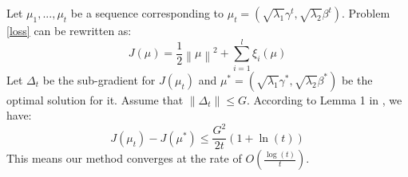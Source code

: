
Let $\mu_1,...,\mu_t$ be a sequence corresponding to $\mu_t=(\sqrt{\lambda_1}\gamma^t,\sqrt{\lambda_2}\beta^t)$. Problem \eqref{loss} can be rewritten as:
\begin{equation*}
J(\mu)=\frac{1}{2}{\left\| \mu  \right\|^2} + \sum\limits_{i = 1}^l {{\xi _i}\left( \mu  \right)} 
\end{equation*}
Let $\Delta_t$ be the sub-gradient for $J(\mu_t)$ and  $\mu^*=(\sqrt{\lambda_1}\gamma^*, \sqrt{\lambda_2}\beta^*)$ be the optimal solution for it. Assume that $\left\| {{\Delta _t}} \right\| \le G$. According to Lemma 1 in \cite{shalev2011pegasos}, we have:
\begin{equation}
J({\mu_t}) - J(\mu^*) \le \frac{{{G^2}}}{{2t}}\left( {1 + \ln \left( t \right)} \right)
\end{equation}
This means our method converges at the rate of $O(\frac{\log(t)}{t})$.

